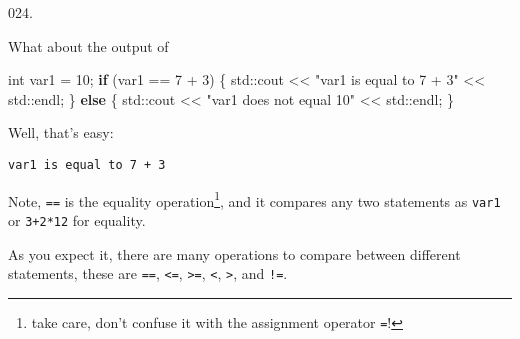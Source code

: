 \documentclass[]{book}
\newenvironment{Shaded}{}{}
\newcommand{\BuiltInTok}[1]{#1}
\newcommand{\ControlFlowTok}[1]{\textcolor[rgb]{0.00,0.44,0.13}{\textbf{#1}}}
\newcommand{\DataTypeTok}[1]{\textcolor[rgb]{0.56,0.13,0.00}{#1}}
\newcommand{\DecValTok}[1]{\textcolor[rgb]{0.25,0.63,0.44}{#1}}
\newcommand{\NormalTok}[1]{#1}
\newcommand{\StringTok}[1]{\textcolor[rgb]{0.25,0.44,0.63}{#1}}
\begin{document}
\begin{minipage}{\linewidth}\noindent
{\tiny 024.}\\
\begin{minipage}[t]{.485\linewidth}

What about the output of

\begin{framed}

\begin{Shaded}
\begin{Highlighting}[]
\DataTypeTok{int}\NormalTok{ var1 = }\DecValTok{10}\NormalTok{;}
\ControlFlowTok{if}\NormalTok{ (var1 == }\DecValTok{7}\NormalTok{ + }\DecValTok{3}\NormalTok{) \{}
  \BuiltInTok{std::}\NormalTok{cout << }\StringTok{"var1 is equal to 7 + 3"}
\NormalTok{            << }\BuiltInTok{std::}\NormalTok{endl;}
\NormalTok{\} }\ControlFlowTok{else}\NormalTok{ \{}
  \BuiltInTok{std::}\NormalTok{cout << }\StringTok{"var1 does not equal 10"}
\NormalTok{    << }\BuiltInTok{std::}\NormalTok{endl;}
\NormalTok{\}}
\end{Highlighting}
\end{Shaded}

\end{framed}

\end{minipage}
\hfill
\begin{minipage}[t]{.485\linewidth}

Well, that's easy:

\begin{framed}

\begin{verbatim}
var1 is equal to 7 + 3
\end{verbatim}

\end{framed}

Note, \texttt{==} is the equality operation\footnote{take care, don't
  confuse it with the assignment operator \texttt{=}!}, and it compares
any two statements as \texttt{var1} or \texttt{3+2*12} for equality.

As you expect it, there are many operations to compare between different
statements, these are \texttt{==}, \texttt{\textless{}=},
\texttt{\textgreater{}=}, \texttt{\textless{}}, \texttt{\textgreater{}},
and \texttt{!=}.

\end{minipage}
\end{minipage}

\vspace{2mm}\noindent\hrulefill{}
\end{document}
